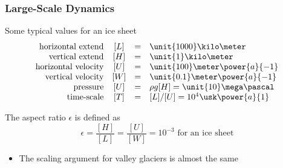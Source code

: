 \documentclass[hide notes,intlimits]{beamer}
\begin{document}

\begin{frame}
  \frametitle{Large-Scale Dynamics}
  \begin{block}{Some typical values for an ice sheet}
  \begin{equation*}
  \begin{array}{rccl}
    \text{horizontal extend} &  [L] & = & \unit{1000}\kilo\meter\\
    \text{vertical extend} & [H] & = & \unit{1}\kilo\meter \\
    \text{horizontal velocity} & [U] & = & \unit{100}\meter\power{a}{-1}\\
    \text{vertical velocity} & [W] & = & \unit{0.1}\meter\power{a}{-1}\\
    \text{pressure} & [U] & = & \rho g[H] = \unit{10}\mega\pascal\\
    \text{time-scale} & [T] & = &[L]/[U] = 10^{4}\usk\power{a}{1}\\
  \end{array}
  \end{equation*}
  \end{block}
  The aspect ratio $\epsilon$ is defined as
  \begin{equation*}
    \epsilon = \frac{[H]}{[L]} = \frac{[U]}{[W]} = 10^{-3} \text{ for an ice sheet}
  \end{equation*}
  \begin{itemize}
    \item The scaling argument for valley glaciers is almost the same
   \end{itemize}
\end{frame}
\end{document}
